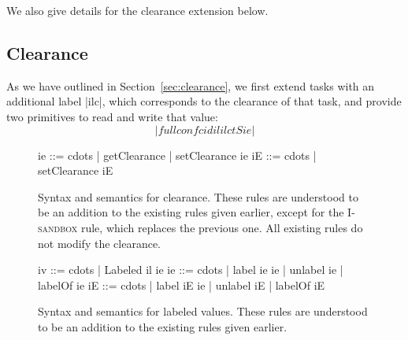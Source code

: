 We also give details for the clearance extension below.

\subsection{Clearance}

As we have outlined in Section~\ref{sec:clearance}, we first extend
tasks with an additional label |ilc|, which corresponds to the
clearance of that task, and provide two primitives to read and
write that value:
\[ |fullconfc id il ilc tS ie| \]

\begin{figure}
  \begin{code}
    ie  ::= cdots | getClearance | setClearance ie
    iE  ::= cdots | setClearance iE
  \end{code}
  \caption{Syntax and semantics for clearance.  These rules are
    understood to be an addition to the existing rules given earlier,
    except for the \textsc{I-sandbox} rule, which replaces the previous
    one.
    All existing rules do not modify the clearance.}
  \label{fig:clearance}
\end{figure}



\begin{figure}
  \begin{code}
    iv  ::= cdots | Labeled il ie
    ie  ::= cdots | label ie ie | unlabel ie | labelOf ie
    iE  ::= cdots | label iE ie | unlabel iE | labelOf iE
  \end{code}
  \caption{Syntax and semantics for labeled values.  These rules are
    understood to be an addition to the existing rules given earlier.}
  \label{fig:labeled-vals}
\end{figure}

